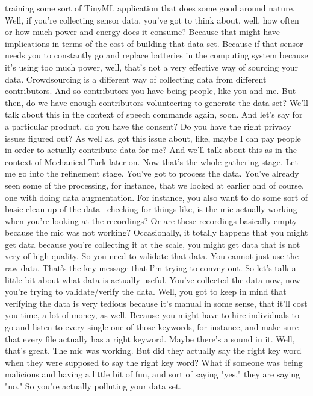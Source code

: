 training some sort of TinyML application that does some good around nature.
Well, if you're collecting sensor data, you've
got to think about, well, how often or how much power and energy does
it consume?
Because that might have implications in terms of the cost of building
that data set.
Because if that sensor needs you to constantly go and replace batteries
in the computing system because it's using too much power,
well, that's not a very effective way of sourcing your data.
Crowdsourcing is a different way of collecting data
from different contributors.
And so contributors you have being people, like you and me.
But then, do we have enough contributors volunteering to generate the data set?
We'll talk about this in the context of speech commands again, soon.
And let's say for a particular product, do you have the consent?
Do you have the right privacy issues figured out?
As well as, got this issue about, like, maybe I
can pay people in order to actually contribute data for me?
And we'll talk about this as in the context of Mechanical Turk later on.
Now that's the whole gathering stage.
Let me go into the refinement stage.
You've got to process the data.
You've already seen some of the processing,
for instance, that we looked at earlier and of course,
one with doing data augmentation.
For instance, you also want to do some sort of basic clean up of the data--
checking for things like, is the mic actually
working when you're looking at the recordings?
Or are these recordings basically empty because the mic was not working?
Occasionally, it totally happens that you might get data
because you're collecting it at the scale,
you might get data that is not very of high quality.
So you need to validate that data.
You cannot just use the raw data.
That's the key message that I'm trying to convey out.
So let's talk a little bit about what data is actually useful.
You've collected the data now, now you're
trying to validate/verify the data.
Well, you got to keep in mind that verifying the data
is very tedious because it's manual in some sense,
that it'll cost you time, a lot of money, as well.
Because you might have to hire individuals to go and listen
to every single one of those keywords, for instance,
and make sure that every file actually has a right keyword.
Maybe there's a sound in it.
Well, that's great.
The mic was working.
But did they actually say the right key word
when they were supposed to say the right key word?
What if someone was being malicious and having a little bit of fun,
and sort of saying "yes," they are saying "no."
So you're actually polluting your data set.
